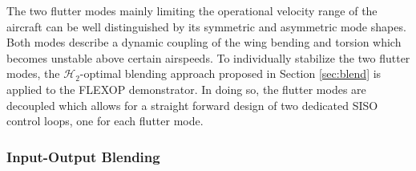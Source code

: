 \documentclass[aerospace,article,submit,moreauthors,pdftex,10pt,a4paper]{Definitions/mdpi}
\begin{document}
The two flutter modes mainly limiting the operational velocity range of the aircraft can be well distinguished by its symmetric and asymmetric mode shapes. Both modes describe a dynamic coupling of the wing bending and torsion which becomes unstable above certain airspeeds.
To individually stabilize the two flutter modes, the $\mathcal{H}_2$-optimal blending approach proposed in Section \ref{sec:blend} is applied to the FLEXOP demonstrator. In doing so, the flutter modes are decoupled which allows for a straight forward design of two dedicated SISO control loops, one for each flutter mode. 


\subsubsection{Input-Output Blending}
\end{document}
